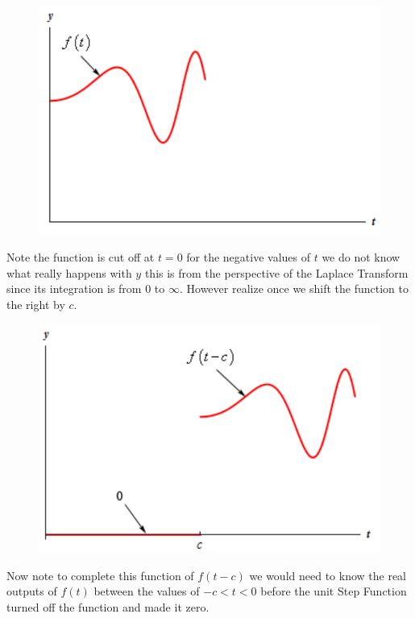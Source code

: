 \documentclass[12pt]{article}
\begin{document}
\pagebreak

\begin{figure}[!htbp]
\centering
\includegraphics[scale=.5]{step6.PNG}
\label{fig:hsf6}
\end{figure}

Note the function is cut off at $t=0$ for the negative values of $t$ we do not know what really happens with $y$ this is from the perspective of the Laplace Transform since its integration is from 0 to $\infty$. However realize once we shift the function to the right by $c$.

\begin{figure}[!htbp]
\centering
\includegraphics[scale=.5]{step7.PNG}
\label{fig:hsf7}
\end{figure}

Now note to complete this function of $f(t-c)$ we would need to know the real outputs of $f(t)$ between the values of $-c<t<0$ before the unit Step Function turned off the function and made it zero. 
\end{document}
